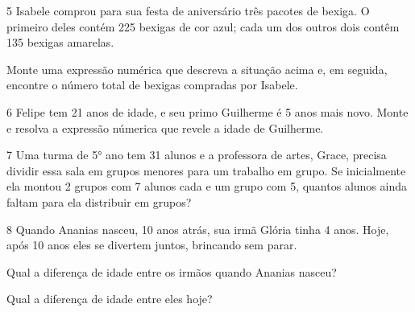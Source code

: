 

\num{5} Isabele comprou para sua festa de aniversário três pacotes de
bexiga. O primeiro deles contém 225 bexigas de cor azul; cada um dos
outros dois contêm 135 bexigas amarelas.

Monte uma expressão numérica que descreva a situação acima 
e, em seguida, encontre o número total de bexigas compradas por Isabele.



\num{6} Felipe tem 21 anos de idade, e seu primo Guilherme é 5 anos mais
novo. Monte e resolva a expressão númerica que revele a
idade de Guilherme.



\num{7} Uma turma de 5° ano tem 31 alunos e a professora de artes, Grace,
precisa dividir essa sala em grupos menores para um trabalho em grupo.
Se inicialmente ela montou 2 grupos com 7 alunos cada e um grupo com 5,
quantos alunos ainda faltam para ela distribuir em grupos?



\num{8} Quando Ananias nasceu, 10 anos atrás, sua irmã Glória tinha 4 
anos. Hoje, após 10 anos eles se divertem juntos, brincando sem parar.

\begin{escolha}
\item
  Qual a diferença de idade entre os irmãos quando Ananias nasceu?


\item
  Qual a diferença de idade entre eles hoje?

\end{escolha}


